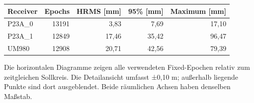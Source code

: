 \documentclass[11pt,a4paper]{article}
\numberwithin{equation}{section}
\numberwithin{figure}{section}
\begin{document}
\begin{center}\begin{lrbox}{\reporttable}\small\setlength{\tabcolsep}{4pt}\begin{tabular}{lrrrr}\toprule
Receiver & Epochs & HRMS [mm] & 95\% [mm] & Maximum [mm]\\\midrule
P23A\_0 & 13191 & 3,83 & 7,69 & 17,10\\
P23A\_1 & 12849 & 17,46 & 35,42 & 96,47\\
UM980 & 12908 & 20,71 & 42,56 & 79,39\\
\bottomrule\end{tabular}\end{lrbox}\ifdim\wd\reporttable>\linewidth\resizebox{\linewidth}{!}{\usebox{\reporttable}}\else\usebox{\reporttable}\fi\end{center}

Die horizontalen Diagramme zeigen alle verwendeten Fixed-Epochen relativ zum zeitgleichen Sollkreis. Die Detailansicht umfasst ±0,10 m; außerhalb liegende Punkte sind dort ausgeblendet. Beide räumlichen Achsen haben denselben Maßstab.
\end{document}
